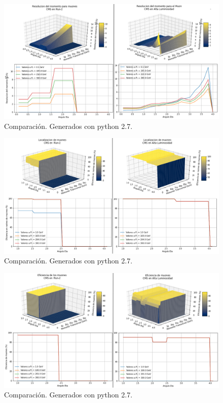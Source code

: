 

\begin{figure}[ht]
\centering
\includegraphics[width=1\textwidth]{Analisis_y_Resultados/imagenes/Momentum_resolution_of_Muon.png}
\caption{Comparación. Generados con python 2.7.}
\end{figure}

\begin{figure}[ht]
\centering
\includegraphics[width=1\textwidth]{Analisis_y_Resultados/imagenes/Tracking_of_Muon.png}
\caption{Comparación. Generados con python 2.7.}
\end{figure}

\begin{figure}[ht]
\centering
\includegraphics[width=1\textwidth]{Analisis_y_Resultados/imagenes/Eficiencia_of_Muon.png}
\caption{Comparación. Generados con python 2.7.}
\end{figure}





